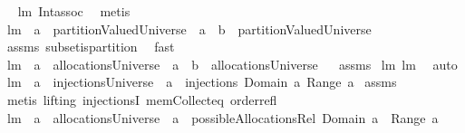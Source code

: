 \begin{isabellebody}
\isadelimproof
\ %
\endisadelimproof
%
\isatagproof
{}\isamarkupfalse%
\ lm{}{}\ Int{\isacharunderscore}assoc\ \isamarkupfalse%
\ {\isacharparenleft}metis{\isacharparenright}%
\endisatagproof
{\isafoldproof}%
%
\isadelimproof
%
\endisadelimproof
\isanewline
\isanewline
{}\isamarkupfalse%
\ lm{}{}{\isacharcolon}\ \ {\isachardoublequoteopen}a\ {\isasymin}\ partitionValuedUniverse{\isachardoublequoteclose}\ \ {\isachardoublequoteopen}a\ {\isacharminus}\ b\ {\isasymin}\ partitionValuedUniverse{\isachardoublequoteclose}\ \isanewline
%
\isadelimproof
%
\endisadelimproof
%
\isatagproof
{}\isamarkupfalse%
\ assms\ subset{\isacharunderscore}is{\isacharunderscore}partition\ \isamarkupfalse%
\ fast%
\endisatagproof
{\isafoldproof}%
%
\isadelimproof
\isanewline
%
\endisadelimproof
\isanewline
{}\isamarkupfalse%
\ lm{}{}{\isacharcolon}\ \ {\isachardoublequoteopen}a\ {\isasymin}\ allocationsUniverse{\isachardoublequoteclose}\ \ {\isachardoublequoteopen}a\ {\isacharminus}\ b\ {\isasymin}\ allocationsUniverse{\isachardoublequoteclose}%
\isadelimproof
\ %
\endisadelimproof
%
\isatagproof
{}\isamarkupfalse%
\ assms\ \isanewline
lm{}{}\ lm{}{}\ \isamarkupfalse%
\ auto%
\endisatagproof
{\isafoldproof}%
%
\isadelimproof
%
\endisadelimproof
\isanewline
\isanewline
{}\isamarkupfalse%
\ lm{}{}{\isacharcolon}\ \ {\isachardoublequoteopen}a\ {\isasymin}\ injectionsUniverse{\isachardoublequoteclose}\ \ {\isachardoublequoteopen}a\ {\isasymin}\ injections\ {\isacharparenleft}Domain\ a{\isacharparenright}\ {\isacharparenleft}Range\ a{\isacharparenright}{\isachardoublequoteclose}\isanewline
%
\isadelimproof
%
\endisadelimproof
%
\isatagproof
{}\isamarkupfalse%
\ assms\ \isamarkupfalse%
\ {\isacharparenleft}metis\ {\isacharparenleft}lifting{\isacharparenright}\ injectionsI\ mem{\isacharunderscore}Collect{\isacharunderscore}eq\ order{\isacharunderscore}refl{\isacharparenright}%
\endisatagproof
{\isafoldproof}%
%
\isadelimproof
\isanewline
%
\endisadelimproof
\isanewline
{}\isamarkupfalse%
\ lm{}{}{\isacharcolon}\ \ {\isachardoublequoteopen}a\ {\isasymin}\ allocationsUniverse{\isachardoublequoteclose}\ \ {\isachardoublequoteopen}a\ {\isasymin}\ possibleAllocationsRel\ {\isacharparenleft}Domain\ a{\isacharparenright}\ {\isacharparenleft}{\isasymUnion}\ {\isacharparenleft}Range\ a{\isacharparenright}{\isacharparenright}{\isachardoublequoteclose}\isanewline

\end{isabellebody}
